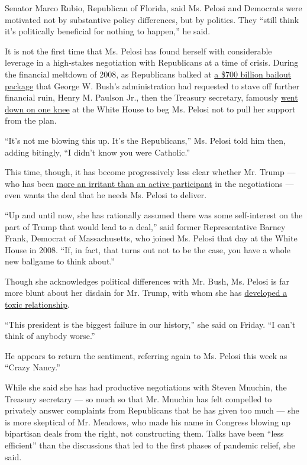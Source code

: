Senator Marco Rubio, Republican of Florida, said Ms. Pelosi and
Democrats were motivated not by substantive policy differences, but by
politics. They ``still think it's politically beneficial for nothing to
happen,'' he said.

It is not the first time that Ms. Pelosi has found herself with
considerable leverage in a high-stakes negotiation with Republicans at a
time of crisis. During the financial meltdown of 2008, as Republicans
balked at
\href{http://archive.nytimes.com/www.nytimes.com/packages/html/national/200904_CREDITCRISIS/recipients.html}{a
\$700 billion bailout package} that George W. Bush's administration had
requested to stave off further financial ruin, Henry M. Paulson Jr.,
then the Treasury secretary, famously
\href{https://www.nytimes.com/2008/09/26/business/26bailout.html}{went
down on one knee} at the White House to beg Ms. Pelosi not to pull her
support from the plan.

``It's not me blowing this up. It's the Republicans,'' Ms. Pelosi told
him then, adding bitingly, ``I didn't know you were Catholic.''

This time, though, it has become progressively less clear whether Mr.
Trump --- who has been
\href{https://www.nytimes.com/2020/08/03/us/politics/congress-jobless-aid-talks-trump.html}{more
an irritant than an active participant} in the negotiations --- even
wants the deal that he needs Ms. Pelosi to deliver.

``Up and until now, she has rationally assumed there was some
self-interest on the part of Trump that would lead to a deal,'' said
former Representative Barney Frank, Democrat of Massachusetts, who
joined Ms. Pelosi that day at the White House in 2008. ``If, in fact,
that turns out not to be the case, you have a whole new ballgame to
think about.''

Though she acknowledges political differences with Mr. Bush, Ms. Pelosi
is far more blunt about her disdain for Mr. Trump, with whom she has
\href{https://www.nytimes.com/2019/10/18/us/politics/trump-pelosi-photo.html}{developed
a toxic relationship}.

``This president is the biggest failure in our history,'' she said on
Friday. ``I can't think of anybody worse.''

He appears to return the sentiment, referring again to Ms. Pelosi this
week as ``Crazy Nancy.''

While she said she has had productive negotiations with Steven Mnuchin,
the Treasury secretary --- so much so that Mr. Mnuchin has felt
compelled to privately answer complaints from Republicans that he has
given too much --- she is more skeptical of Mr. Meadows, who made his
name in Congress blowing up bipartisan deals from the right, not
constructing them. Talks have been ``less efficient'' than the
discussions that led to the first phases of pandemic relief, she said.


